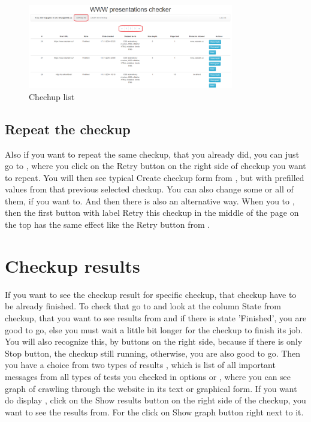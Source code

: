 \documentclass[12pt,a4paper]{article}
\begin{document}
\begin{figure}[H]
    \centering
    \includegraphics[width=0.8\textwidth]{pictures/list.png}
		\caption{Chechup list}
		\label{fig:list}
\end{figure}

\subsection{Repeat the checkup}
Also if you want to repeat the same checkup, that you already did, you can just go to , where you click on the Retry button on the right side of checkup you want to repeat. You will then see typical Create checkup form from , but with prefilled values from that previous selected checkup. You can also change some or all of them, if you want to. And then there is also an alternative way. When you to \label{messages}, then the first button with label Retry this checkup in the middle of the page on the top has the same effect like the Retry button from \label{results}.

\section{Checkup results} \label{results}
If you want to see the checkup result for specific checkup, that checkup have to be already finished. To check that go to \label{list} and look at the column State from checkup, that you want to see results from and if there is state 'Finished', you are good to go, else you must wait a little bit longer for the checkup to finish its job. You will also recognize this, by buttons on the right side, because if there is only Stop button, the checkup still running, otherwise, you are also good to go. Then you have a choice from two types of results , which is list of all important messages from all types of tests you checked in options or , where you can see graph of crawling through the website in its text or graphical form. If you want do display , click on the Show results button on the right side of the checkup, you want to see the results from. For the  click on Show graph button right next to it.
\end{document}
